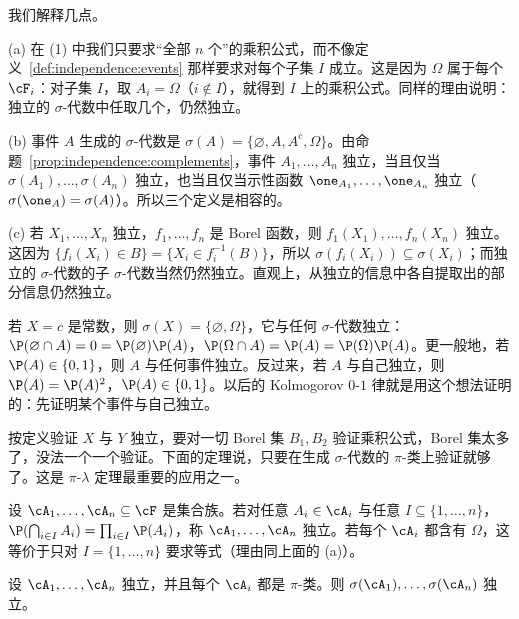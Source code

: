 我们解释几点。

(a) 在 (1) 中我们只要求“全部 $n$ 个”的乘积公式，而不像定义~\ref{def:independence:events} 那样要求对每个子集 $I$ 成立。这是因为 $\Omega$ 属于每个 $\cF_i$：对子集 $I$，取 $A_i=\Omega$（$i\notin I$），就得到 $I$ 上的乘积公式。同样的理由说明：独立的 $\sigma$-代数中任取几个，仍然独立。

(b) 事件 $A$ 生成的 $\sigma$-代数是 $\sigma(A)=\{\varnothing,A,A^c,\Omega\}$。由命题~\ref{prop:independence:complements}，事件 $A_1,\dots,A_n$ 独立，当且仅当 $\sigma(A_1),\dots,\sigma(A_n)$ 独立，也当且仅当示性函数 $\one_{A_1},\dots,\one_{A_n}$ 独立（$\sigma(\one_A)=\sigma(A)$）。所以三个定义是相容的。

(c) 若 $X_1,\dots,X_n$ 独立，$f_1,\dots,f_n$ 是 Borel 函数，则 $f_1(X_1),\dots,f_n(X_n)$ 独立。这因为 $\{f_i(X_i)\in B\}=\{X_i\in f_i^{-1}(B)\}$，所以 $\sigma(f_i(X_i))\subseteq\sigma(X_i)$；而独立的 $\sigma$-代数的子 $\sigma$-代数当然仍然独立。直观上，从独立的信息中各自提取出的部分信息仍然独立。

\begin{example}[常数与一切独立]\label{ex:independence:constant}
若 $X=c$ 是常数，则 $\sigma(X)=\{\varnothing,\Omega\}$，它与任何 $\sigma$-代数独立：$\P(\varnothing\cap A)=0=\P(\varnothing)\P(A)$，$\P(\Omega\cap A)=\P(A)=\P(\Omega)\P(A)$。更一般地，若 $\P(A)\in\{0,1\}$，则 $A$ 与任何事件独立。反过来，若 $A$ 与自己独立，则 $\P(A)=\P(A)^2$，$\P(A)\in\{0,1\}$。以后的 Kolmogorov $0$-$1$ 律就是用这个想法证明的：先证明某个事件与自己独立。
\end{example}


按定义验证 $X$ 与 $Y$ 独立，要对一切 Borel 集 $B_1,B_2$ 验证乘积公式，Borel 集太多了，没法一个一个验证。下面的定理说，只要在生成 $\sigma$-代数的 $\pi$-类上验证就够了。这是 $\pi$-$\lambda$ 定理最重要的应用之一。

\begin{definition}\label{def:independence:collections}
设 $\cA_1,\dots,\cA_n\subseteq\cF$ 是集合族。若对任意 $A_i\in\cA_i$ 与任意 $I\subseteq\{1,\dots,n\}$，$\P(\bigcap_{i\in I}A_i)=\prod_{i\in I}\P(A_i)$，称 $\cA_1,\dots,\cA_n$ 独立。若每个 $\cA_i$ 都含有 $\Omega$，这等价于只对 $I=\{1,\dots,n\}$ 要求等式（理由同上面的 (a)）。
\end{definition}

\begin{theorem}[用 $\pi$-类判别独立性]\label{thm:independence:pi-systems}
设 $\cA_1,\dots,\cA_n$ 独立，并且每个 $\cA_i$ 都是 $\pi$-类。则 $\sigma(\cA_1),\dots,\sigma(\cA_n)$ 独立。
\end{theorem}

